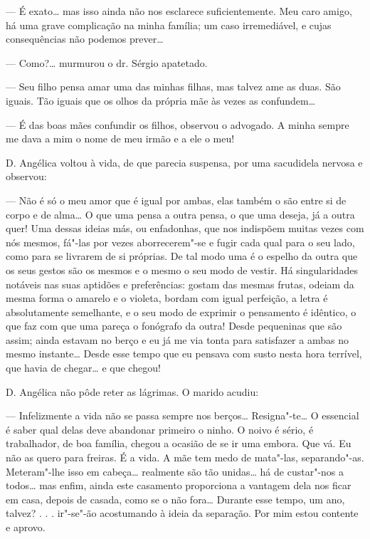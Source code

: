--- É exato\ldots{} mas isso ainda não nos esclarece suficientemente. Meu
caro amigo, há uma grave complicação na minha família; um caso
irremediável, e cujas consequências não podemos prever\ldots{}

--- Como?\ldots{} murmurou o dr. Sérgio apatetado.

--- Seu filho pensa amar uma das minhas filhas, mas talvez ame as duas.
São iguais. Tão iguais que os olhos da própria mãe às vezes as
confundem\ldots{}

--- É das boas mães confundir os filhos, observou o advogado. A minha
sempre me dava a mim o nome de meu irmão e a ele o meu!

D. Angélica voltou à vida, de que parecia suspensa, por uma sacudidela
nervosa e observou:

--- Não é só o meu amor que é igual por ambas, elas também o são entre
si de corpo e de alma\ldots{} O que uma pensa a outra pensa, o que uma
deseja, já a outra quer! Uma dessas ideias más, ou enfadonhas, que nos
indispõem muitas vezes com nós mesmos, fá"-las por vezes aborrecerem"-se e
fugir cada qual para o seu lado, como para se livrarem de si próprias.
De tal modo uma é o espelho da outra que os seus gestos são os mesmos e
o mesmo o seu modo de vestir. Há singularidades notáveis nas suas
aptidões e preferências: gostam das mesmas frutas, odeiam da mesma forma
o amarelo e o violeta, bordam com igual perfeição, a letra é
absolutamente semelhante, e o seu modo de exprimir o pensamento é
idêntico, o que faz com que uma pareça o fonógrafo da outra! Desde
pequeninas que são assim; ainda estavam no berço e eu já me via tonta
para satisfazer a ambas no mesmo instante\ldots{} Desde esse tempo que eu
pensava com susto nesta hora terrível, que havia de chegar\ldots{} e que
chegou!

D. Angélica não pôde reter as lágrimas. O marido acudiu:

--- Infelizmente a vida não se passa sempre nos berços\ldots{} Resigna"-te\ldots{}
O essencial é saber qual delas deve abandonar primeiro o ninho. O noivo
é sério, é trabalhador, de boa família, chegou a ocasião de se ir uma
embora. Que vá. Eu não as quero para freiras. É a vida. A mãe tem medo
de mata"-las, separando"-as. Meteram"-lhe isso em cabeça\ldots{} realmente são
tão unidas\ldots{} há de custar"-nos a todos\ldots{} mas enfim, ainda este
casamento proporciona a vantagem dela nos ficar em casa, depois de
casada, como se o não fora\ldots{} Durante esse tempo, um ano, talvez? . . .
ir"-se"-ão acostumando à ideia da separação. Por mim estou contente e
aprovo.

